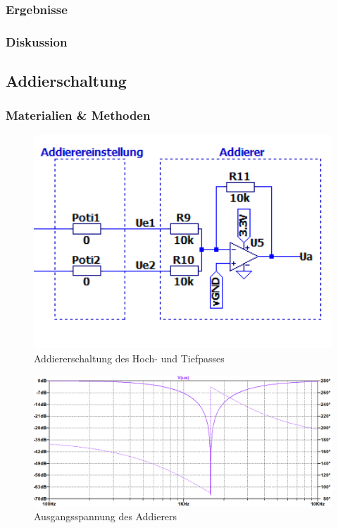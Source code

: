 \subsubsection{Ergebnisse}

\subsubsection{Diskussion}

\newpage
\subsection{Addierschaltung}

\subsubsection{Materialien \& Methoden}

\begin{figure}[htb]
    \includegraphics[width=16cm]{./pictures/Addierer}
    \caption{Addiererschaltung des Hoch- und Tiefpasses}
    \label{fig:Addierer}
\end{figure}

\begin{figure}[htb]
    \includegraphics[width=16cm]{./pictures/Gesamtschaltung}
    \caption{Ausgangsspannung des Addierers}
    \label{fig:AddiererAusgangsspannung}
\end{figure}

